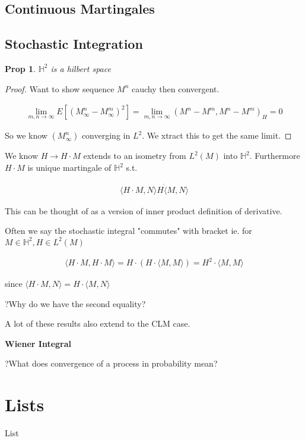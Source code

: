 \documentclass[11pt]{article}
\newtheorem{prop}{Prop}
\begin{document}
\subsection{Continuous Martingales}

\subsection{Stochastic Integration}

\begin{prop}
	$\mathbb{H}^2$ is a hilbert space
\end{prop}

\begin{proof}
	Want to show sequence $M^n$ cauchy then convergent. 

	\begin{align*}
		\lim_{m,n \to \infty}E[(M_{\infty}^n-M_{\infty}^m)^2] = \lim_{m,n \to \infty}(M^n - M^m,M^n- M^m)_H = 0
	\end{align*}

	So we know $(M_{\infty}^n)$ converging in $L^2$. We xtract this to get the same limit. 
\end{proof}

We know $H \to H \cdot M$ extends to an isometry from $L^2(M)$ into $\mathbb{H}^2$. Furthermore $H \cdot M$ is unique martingale of $\mathbb{H}^2$ s.t.

\begin{align*}
	\langle H \cdot M, N \rangle H \dot \langle M ,N\rangle
\end{align*}

This can be thought of as a version of inner product definition of derivative.

Often we say the stochastic integral "commutes" with bracket ie. for $M \in \mathbb{H}^2, H \in L^2(M)$

\begin{align*}
	\langle H \cdot M,H \cdot M\rangle = H \cdot (H \cdot \langle M,M \rangle) = H^2 \cdot \langle M , M \rangle 
\end{align*}

since $\langle H \cdot M,N\rangle = H \cdot \langle M, N \rangle$

?Why do we have the second equality?

A lot of these results also extend to the CLM case.

\textbf{Wiener Integral}

?What does convergence of a process in probability mean?

\section{Lists}

List

\end{document}
